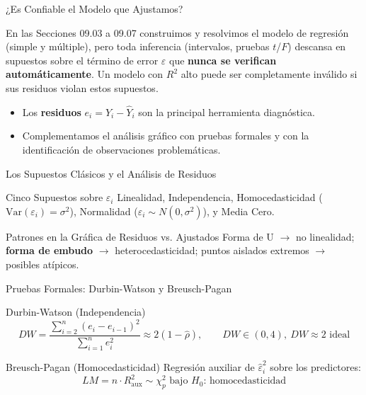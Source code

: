 \documentclass[10pt, aspectratio=169]{beamer}
\begin{document}
\begin{frame}{¿Es Confiable el Modelo que Ajustamos?}
  \footnotesize
  \begin{motivacion}
    En las Secciones 09.03 a 09.07 construimos y resolvimos el modelo de regresión (simple y múltiple), pero toda inferencia (intervalos, pruebas $t$/$F$) descansa en supuestos sobre el término de error $\varepsilon$ que \textbf{nunca se verifican automáticamente}. Un modelo con $R^2$ alto puede ser completamente inválido si sus residuos violan estos supuestos.
  \end{motivacion}

  \vspace{0.15cm}
  \pause
  \begin{itemize}\itemsep=0.1cm
    \item Los \textbf{residuos} $e_i=Y_i-\hat Y_i$ son la principal herramienta diagnóstica. \pause
    \item Complementamos el análisis gráfico con pruebas formales y con la identificación de observaciones problemáticas.
  \end{itemize}
\end{frame}

\begin{frame}{Los Supuestos Clásicos y el Análisis de Residuos}
  \footnotesize
  \begin{block}{Cinco Supuestos sobre $\varepsilon_i$}
    Linealidad, Independencia, Homocedasticidad ($\text{Var}(\varepsilon_i)=\sigma^2$), Normalidad ($\varepsilon_i\sim N(0,\sigma^2)$), y Media Cero.
  \end{block}
  \pause

  \vspace{0.1cm}
  \begin{alertblock}{Patrones en la Gráfica de Residuos vs. Ajustados}
    Forma de U $\to$ no linealidad; \textbf{forma de embudo} $\to$ heterocedasticidad; puntos aislados extremos $\to$ posibles atípicos.
  \end{alertblock}
\end{frame}

\begin{frame}{Pruebas Formales: Durbin-Watson y Breusch-Pagan}
  \footnotesize
  \begin{block}{Durbin-Watson (Independencia)}
    $$DW=\frac{\sum_{i=2}^n(e_i-e_{i-1})^2}{\sum_{i=1}^n e_i^2}\approx2(1-\hat\rho), \qquad DW\in(0,4),\ DW\approx2 \text{ ideal}$$
  \end{block}
  \pause

  \vspace{0.1cm}
  \begin{alertblock}{Breusch-Pagan (Homocedasticidad)}
    Regresión auxiliar de $\hat\varepsilon_i^2$ sobre los predictores: $$LM=n\cdot R_{\text{aux}}^2 \sim \chi^2_p \text{ bajo } H_0\text{: homocedasticidad}$$
  \end{alertblock}
\end{frame}
\end{document}
